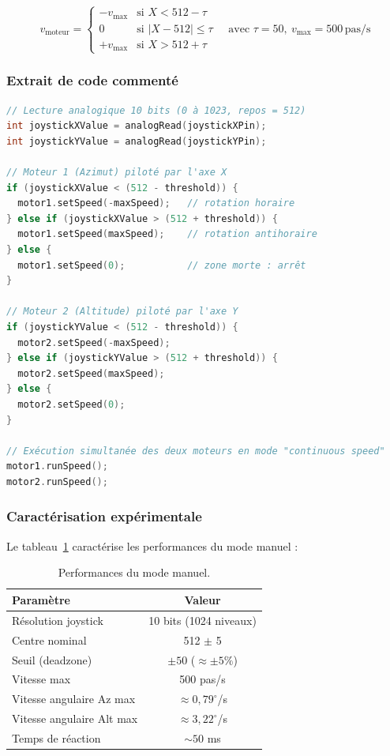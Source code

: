 \documentclass[12pt,a4paper]{report}
\begin{document}
\begin{enumerate}
\begin{equation}
    v_{\text{moteur}} = \begin{cases}
        -v_{\max} & \text{si } X < 512 - \tau \\
        0 & \text{si } |X - 512| \leq \tau \\
        +v_{\max} & \text{si } X > 512 + \tau
    \end{cases}
    \quad \text{avec } \tau = 50,\ v_{\max} = 500\,\text{pas/s}
\end{equation}

\subsubsection{Extrait de code commenté}
\begin{lstlisting}[language=C++, caption={Logique de pilotage joystick (Arduino n°2).}]
// Lecture analogique 10 bits (0 à 1023, repos = 512)
int joystickXValue = analogRead(joystickXPin);
int joystickYValue = analogRead(joystickYPin);

// Moteur 1 (Azimut) piloté par l'axe X
if (joystickXValue < (512 - threshold)) {
  motor1.setSpeed(-maxSpeed);   // rotation horaire
} else if (joystickXValue > (512 + threshold)) {
  motor1.setSpeed(maxSpeed);    // rotation antihoraire
} else {
  motor1.setSpeed(0);           // zone morte : arrêt
}

// Moteur 2 (Altitude) piloté par l'axe Y
if (joystickYValue < (512 - threshold)) {
  motor2.setSpeed(-maxSpeed);
} else if (joystickYValue > (512 + threshold)) {
  motor2.setSpeed(maxSpeed);
} else {
  motor2.setSpeed(0);
}

// Exécution simultanée des deux moteurs en mode "continuous speed"
motor1.runSpeed();
motor2.runSpeed();
\end{lstlisting}

\subsubsection{Caractérisation expérimentale}
Le tableau~\ref{tab:joystick} caractérise les performances du mode manuel :
\begin{table}[H]
    \centering
    \caption{Performances du mode manuel.}
    \label{tab:joystick}
    \begin{tabular}{|l|c|}
        \hline
        \textbf{Paramètre} & \textbf{Valeur} \\
        \hline
        Résolution joystick & 10 bits (1024 niveaux) \\
        Centre nominal & 512 $\pm$ 5 \\
        Seuil (deadzone) & $\pm 50$ ($\approx \pm 5\%$) \\
        Vitesse max & 500 pas/s \\
        Vitesse angulaire Az max & $\approx 0{,}79^\circ$/s \\
        Vitesse angulaire Alt max & $\approx 3{,}22^\circ$/s \\
        Temps de réaction & $\sim 50$ ms \\
        \hline
    \end{tabular}
\end{table}


\end{enumerate}
\end{document}
